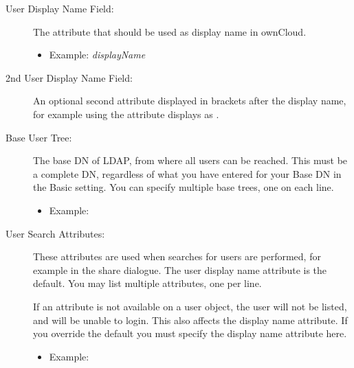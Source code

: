 \documentclass[letterpaper,10pt,english]{sphinxmanual}
\begin{document}
\begin{description}
\item[{User Display Name Field:}] \leavevmode
The attribute that should be used as display name in ownCloud.
\begin{itemize}
\item {} 
Example: \emph{displayName}

\end{itemize}

\item[{2nd User Display Name Field:}] \leavevmode
An optional second attribute displayed in brackets after the display name,
for example using the  attribute displays as .

\item[{Base User Tree:}] \leavevmode
The base DN of LDAP, from where all users can be reached. This must be a
complete DN, regardless of what you have entered for your Base DN in the
Basic setting. You can specify multiple base trees, one on each line.
\begin{itemize}
\item {} 
Example:


\end{itemize}

\item[{User Search Attributes:}] \leavevmode
These attributes are used when searches for users are performed, for example
in the share dialogue. The user display name attribute is the
default. You may list multiple attributes, one per line.

If an attribute is not available on a user object, the user will not be
listed, and will be unable to login. This also affects the display name
attribute. If you override the default you must specify the display name
attribute here.
\begin{itemize}
\item {} 
Example:



\end{itemize}
\end{description}
\end{document}
